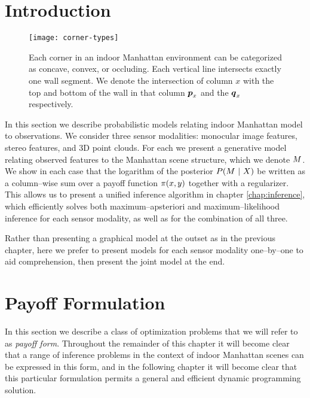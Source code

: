 \section{Introduction}

\begin{figure}[tb]%
  \centering
  \label{fig:corner-types}
  \texttt{[image: corner-types]}
  \hspace{0.1cm}
  \caption{Each corner in an indoor Manhattan environment can be
    categorized as concave, convex, or occluding. Each vertical line
    intersects exactly one wall segment. We denote the intersection of
    column $x$ with the top and bottom of the wall in that column
    $\PfAtX$ and the $\PcAtX$ respectively.}
\end{figure}

In this section we describe probabilistic models relating indoor
Manhattan model to observations. We consider three sensor modalities:
monocular image features, stereo features, and 3D point clouds. For
each we present a generative model relating observed features to the
Manhattan scene structure, which we denote $\Scene$. We show in each
case that the logarithm of the posterior $P(\Scene~|~X)$ be written as
a column--wise sum over a payoff function $\PixelPayoff(x,y)$ together
with a regularizer. This allows us to present a unified inference
algorithm in chapter \ref{chap:inference}, which efficiently solves
both maximum--apsteriori and maximum--likelihood inference for each
sensor modality, as well as for the combination of all three.

Rather than presenting a graphical model at the outset as in the
previous chapter, here we prefer to present models for each sensor
modality one--by--one to aid comprehension, then present the joint
model at the end.

\section{Payoff Formulation}

In this section we describe a class of optimization problems that we
will refer to as \textit{payoff form}. Throughout the remainder of
this chapter it will become clear that a range of inference problems
in the context of indoor Manhattan scenes can be expressed in this
form, and in the following chapter it will become clear that this
particular formulation permits a general and efficient dynamic
programming solution.

